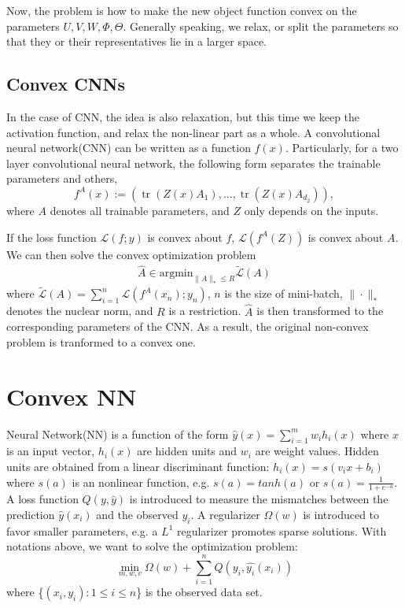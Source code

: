 \documentclass{article}
\DeclareMathOperator{\tr}{tr}
\begin{document}
Now, the problem is how to make the new object function convex on the parameters $U,V,W,\Phi,\Theta$. Generally speaking, we relax, or split the parameters so that they or their representatives lie in a larger space.

\subsection{Convex CNNs}
In the case of CNN, the idea is also relaxation, but this time we keep the activation function, and relax the non-linear part as a whole. A convolutional neural network(CNN) can be written as a function $f(x)$. Particularly, for a two layer convolutional neural network, the following form separates the trainable parameters and others,
\[f^A(x):=(\tr(Z(x)A_1),...,\tr(Z(x)A_{d_2})),\]
where $A$ denotes all trainable parameters, and $Z$ only depends on the inputs.

If the loss function $\mathcal{L}(f;y)$ is convex about $f$, $\mathcal{L}(f^A(Z))$ is convex about $A$. We can then solve the convex optimization problem
\begin{align*}
\widehat{A}\in\text{argmin}_{\|A\|_*\leq R}\tilde{\mathcal{L}}(A)
\end{align*}
where $\tilde{\mathcal{L}}(A)=\sum_{i=1}^n\mathcal{L}(f^A(x_n);y_n)$, $n$ is the size of mini-batch, $\|\cdot\|_*$ denotes the nuclear norm, and $R$ is a restriction. $\widehat{A}$ is then transformed to the corresponding parameters of the CNN. As a result, the original non-convex problem is tranformed to a convex one.
\section{Convex NN}
Neural Network(NN) is a function of the form $\hat{y}(x) = \sum_{i=1}^{m} w_{i} h_{i}(x)$ where $x$ is an input vector, $h_{i}(x)$ are hidden units and $w_{i}$ are weight values. Hidden units are obtained from a linear discriminant function: $h_{i}(x) = s(v_{i}x+b_{i})$ where $s(a)$ is an nonlinear function, e.g. $s(a) = tanh(a)$ or $s(a) = \frac{1}{1+e^{-a}}$. A loss function $Q(y,\hat{y})$ is introduced to measure the mismatches between the prediction $\hat{y}(x_{i})$ and the observed $y_{i}$. A regularizer $\Omega(w)$ is introduced to favor smaller parameters, e.g. a $L^{1}$ regularizer promotes sparse solutions. With notations above, we want to solve the optimization problem:
\begin{equation}
\min_{m,w,v} \Omega(w) + \sum_{i=1}^{n}Q(y_{i},\hat{y_{i}}(x_{i})) 
\end{equation}
where \{$(x_{i},y_{i}):1 \le i \le n$\} is the observed data set. 
\end{document}
